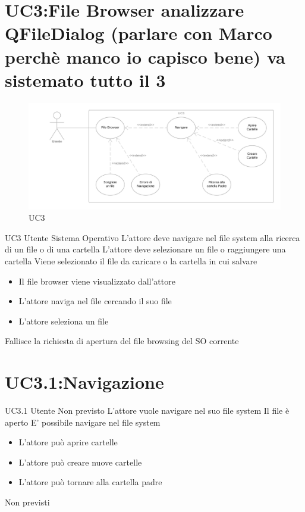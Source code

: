 \documentclass[../AnalisideiRequisiti.tex]{subfiles}
\begin{document}
	\section{UC3:File Browser analizzare QFileDialog (parlare con Marco perchè manco io capisco bene) va sistemato tutto il 3}
	\begin{figure}[H]
		\caption{UC3}
		\centering
		\includegraphics[width=\textwidth]{../img/UC03.png}
	\end{figure}
	\UserCase
	{UC3}
	{Utente}
	{Sistema Operativo}
	{L'attore deve navigare nel file system alla ricerca di un file o di una cartella}
	{L'attore deve selezionare un file o raggiungere una cartella}
	{Viene selezionato il file da caricare o la cartella in cui salvare}
	{
		\begin{itemize}
			\item{} Il file browser viene visualizzato dall'attore
			\item{} L'attore naviga nel file  cercando il suo file 
			\item{} L'attore seleziona un file 
		\end{itemize}
	}
	{Fallisce la richiesta di apertura del file browsing del SO corrente}
	\section{UC3.1:Navigazione}
	\UserCase
	{UC3.1}
	{Utente}
	{Non previsto}
	{L'attore vuole navigare nel suo file system}
	{Il file  è aperto}
	{E' possibile navigare nel file system}
	{
		\begin{itemize}
			\item{} L'attore può aprire cartelle 
			\item{} L'attore può creare nuove cartelle 
			\item{} L'attore può tornare alla cartella padre 
		\end{itemize}
	}
	{Non previsti}	
\end{document}
